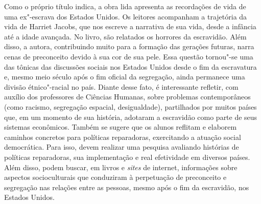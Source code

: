 \documentclass[12pt]{extarticle}
\begin{document}



Como o próprio título indica, a obra lida apresenta as
recordações de vida de uma ex"-escrava dos Estados Unidos. Os leitores
acompanham a trajetória da vida de Harriet Jacobs, que nos escreve a
narrativa de sua vida, desde a infância até a idade avançada. No livro,
são relatados os horrores da escravidão. Além disso, a autora,
contribuindo muito para a formação das gerações futuras, narra cenas de
preconceito devido à sua cor de sua pele. Essa questão tornou"-se uma das
tônicas das discussões sociais nos Estados Unidos desde o fim da
escravatura e, mesmo meio século após o fim oficial da segregação, ainda
permanece uma divisão étnico"-racial no país. Diante desse fato, é
interessante refletir, com auxílio dos professores de Ciências Humanas,
sobre problemas contemporâneos (como racismo, segregação espacial,
desigualdade), partilhados por muitos países que, em um momento de sua
história, adotaram a escravidão como parte de seus sistemas econômicos.
Também se sugere que os alunos reflitam e elaborem caminhos concretos
para políticas reparadoras, exercitando a atuação social democrática.
Para isso, devem realizar uma pesquisa avaliando histórias de políticas
reparadoras, sua implementação e real efetividade em diversos países.
Além disso, podem buscar, em livros e \emph{sites} de internet,
informações sobre aspectos socioculturais que conduziram à perpetuação
de preconceito e segregação nas relações entre as pessoas, mesmo após o
fim da escravidão, nos Estados Unidos.
\end{document}
